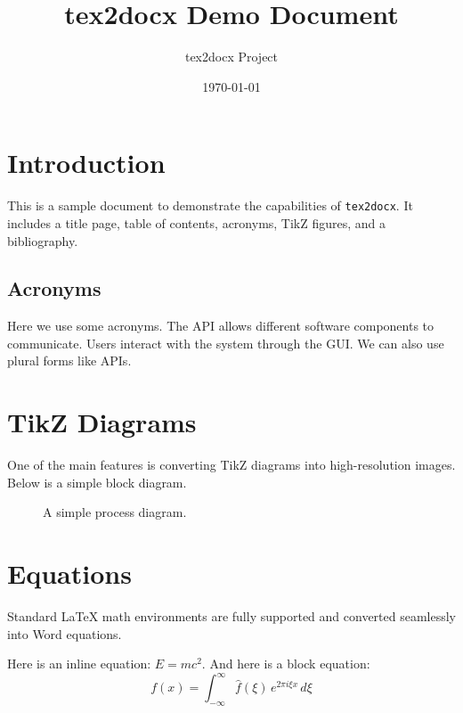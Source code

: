 \documentclass{article}
\title{tex2docx Demo Document}
\author{tex2docx Project}
\date{\today}
\begin{document}
\maketitle
\newpage

\tableofcontents
\newpage

\printacronyms[name=List of Acronyms]
\newpage

\section{Introduction}
This is a sample document to demonstrate the capabilities of \texttt{tex2docx}. It includes a title page, table of contents, acronyms, TikZ figures, and a bibliography.

\subsection{Acronyms}
Here we use some acronyms. The \ac{API} allows different software components to communicate. Users interact with the system through the \ac{GUI}. We can also use plural forms like \acp{API}.

\section{TikZ Diagrams}
One of the main features is converting TikZ diagrams into high-resolution images. Below is a simple block diagram.

\begin{figure}[h!]
  \centering
  \caption{A simple process diagram.}
\end{figure}

\section{Equations}
Standard LaTeX math environments are fully supported and converted seamlessly into Word equations.

Here is an inline equation: $E = mc^2$. And here is a block equation:
\begin{equation}
  f(x) = \int_{-\infty}^{\infty} \hat{f}(\xi)\,e^{2 \pi i \xi x} \,d\xi
\end{equation}
\end{document}
